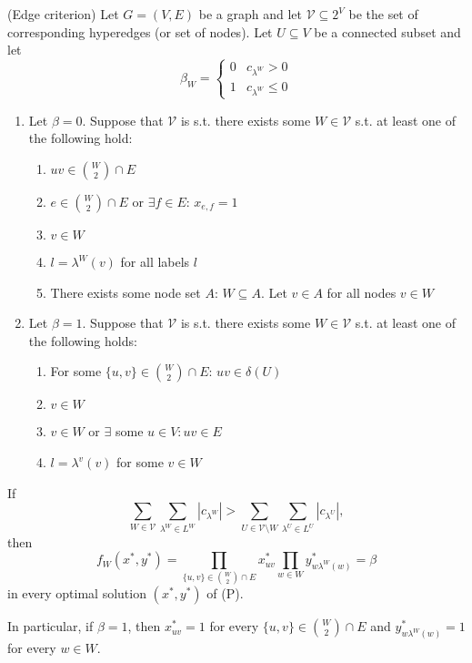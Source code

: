 \begin{theorem}{(Edge criterion)}
Let $G=(V, E)$ be a graph and let $\mathcal{V} \subseteq 2^V$ be the set of corresponding hyperedges (or set of nodes). Let $U \subseteq V$ be a connected subset and let \[ \beta_W = \begin{cases}
    0 & c_{\lambda^W}>0 \\
    1& c_{\lambda^W} \leq 0
\end{cases} \] 
\begin{enumerate}
    \item Let $\beta=0$. Suppose that $\mathcal{V}$ is s.t. there exists some $W \in \mathcal{V}$ s.t. at least one of the following hold: 
    \begin{enumerate}
        \item $uv \in \binom{W}{2} \cap E$ 
        \item $e \in \binom{W}{2} \cap E$ or $\exists f \in E$: $x_{e,f}=1$
        \item $v \in W$
        \item $l=\lambda^W(v)$ for all labels $l$
        \item There exists some node set $A$: $W \subseteq A$. Let $v \in A$ for all nodes $v \in W$ 
    \end{enumerate}
    
    \item Let $\beta=1$. Suppose that $\mathcal{V}$ is s.t. there exists some $W \in \mathcal{V}$ s.t. at least one of the following holds: 
    \begin{enumerate}
        \item For some $\{u,v \} \in \binom{W}{2} \cap E$: $uv \in \delta(U)$
        \item $v \in W$
        \item $v \in W$ or $\exists$ some $u \in V: uv \in E$
        \item $l=\lambda^v(v)$ for some $v \in W$ 
    \end{enumerate}
    \end{enumerate}
    If \begin{equation}
    \sum_{W \in \mathcal{V}} \sum_{\lambda^W \in L^W} |c_{\lambda^W}| >
    \sum_{U \in \mathcal{V}\setminus W}  \sum_{\lambda^U \in L^U} |c_{\lambda^U}|, \end{equation} then \begin{equation}
    f_W(x^*,y^*)=\prod_{\{u,v\} \in \binom{W}{2} \cap E} x^*_{uv} \prod_{w \in W} y^*_{w \lambda^W(w)}= \beta \end{equation} in every optimal solution $(x^*,y^*)$ of (P).
    
    In particular, if $\beta=1$, then $x^*_{uv}=1$ for every $\{u,v\} \in \binom{W}{2} \cap E$ and $y^*_{w \lambda^W(w)}=1$ for every $w \in W$. 
 \end{theorem} 
